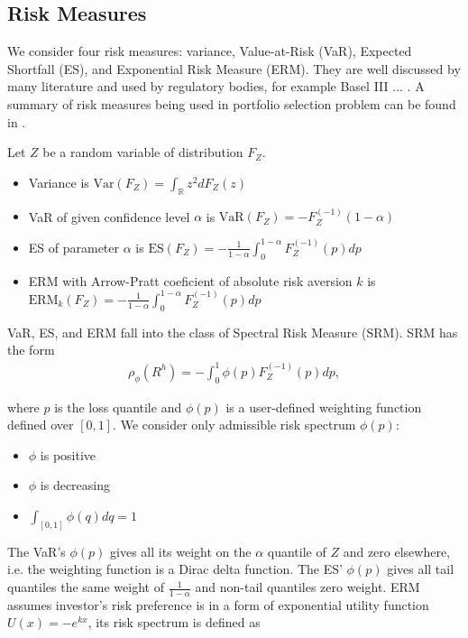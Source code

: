 \subsection{Risk Measures}\label{subsec:spectral-risk-measures}
We consider four risk measures: variance, Value-at-Risk (VaR), Expected Shortfall (ES), and Exponential Risk Measure (ERM).
They are well discussed by many literature  and used by regulatory bodies,
for example Basel III ...  .
A summary of risk measures being used in portfolio selection problem can be found in \citet{hardle2008applied}.\medskip
\medskip


Let $Z$ be a random variable of distribution $F_Z$.
\begin{itemize}
	\item Variance is $\text{Var}(F_Z) = \int_\mathbb{R}z^2 dF_Z(z)$
	\item VaR of given confidence level $\alpha$ is $\text{VaR}(F_Z) = -F_{Z}^{(-1)}(1-\alpha)$
	\item ES of parameter $\alpha$ is $\text{ES}(F_Z) = -\frac{1}{1-\alpha}\int_0^{1-\alpha}F_Z^{(-1)}(p)dp$
	\item ERM with Arrow-Pratt coeficient of absolute risk aversion $k$ is $\text{ERM}_k(F_Z) = -\frac{1}{1-\alpha}\int_0^{1-\alpha}F_Z^{(-1)}(p)dp$
	\end{itemize}\medskip

VaR, ES, and ERM fall into the class of Spectral Risk Measure (SRM).
SRM has the form \citep{Acerbi2002}%
\begin{align}
	\rho_\phi(R^h) = - \int_0^1 \phi(p) F_{Z}^{(-1)}(p)d p,
	\end{align}

where $p$ is the loss quantile and $\phi(p)$ is a user-defined weighting function defined over $[0,1]$. \medskip
We consider only admissible risk spectrum  $\phi(p)$:
\begin{itemize}
	\item $\phi$ is positive
	\item $\phi$ is decreasing
	\item $\int_{[0,1]}\phi(q)dq = 1$
	\end{itemize}\medskip

The VaR's $\phi(p)$ gives all its weight on the $\alpha$ quantile of $Z$ and zero elsewhere,
i.e. the weighting function is a Dirac delta function.
The ES' $\phi(p)$ gives all tail quantiles the same weight of $\frac{1}{1-\alpha}$ and non-tail quantiles zero weight. \medskip
ERM assumes investor's risk preference is in a form of exponential utility function $U(x)=-e^{kx}$,
its risk spectrum is defined as

